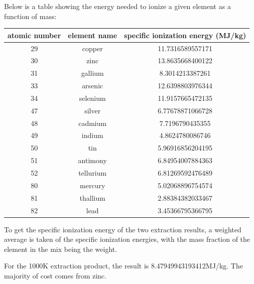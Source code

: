 \documentclass[a4paper]{article}
\begin{document}
	Below is a table showing the energy needed to ionize a given element as a function of mass:
	
	\begin{center}
		\begin{tabular}{|c|c|c|}
			\hline
			atomic number & element name & specific ionization energy (MJ/kg) \\
			\hline
			29 & copper & 11.7316589557171 \\
			\hline
			30 & zinc & 13.8635668400122 \\
			\hline
			31 & gallium & 8.3014213387261 \\
			\hline
			33 & arsenic & 12.6398803976344 \\
			\hline
			34 & selenium & 11.9157665472135 \\
			\hline
			47 & silver & 6.77678871066728 \\
			\hline
			48 & cadmium & 7.7196790435355 \\
			\hline
			49 & indium & 4.8624780086746 \\
			\hline
			50 & tin & 5.96916856204195 \\
			\hline
			51 & antimony & 6.84954007884363 \\
			\hline
			52 & tellurium & 6.81269592476489 \\
			\hline
			80 & mercury & 5.02068896754574 \\
			\hline
			81 & thallium & 2.88384382033467 \\
			\hline
			82 & lead & 3.45366795366795 \\
			\hline
		\end{tabular}
	\end{center}
	
	To get the specific ionization energy of the two extraction results, a weighted average is taken of the specific ionization energies, with the mass fraction of the element in the mix being the weight.
	
	\bigskip
	
	For the 1000K extraction product, the result is 8.47949943193412MJ/kg.
	The majority of cost comes from zinc.
	
\end{document}
